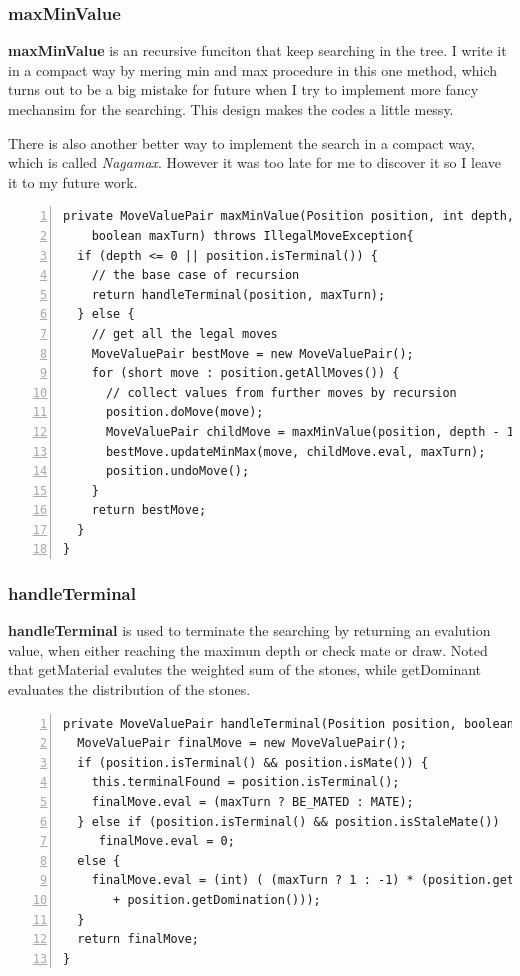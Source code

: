 \documentclass{article}
\begin{document}
\subsubsection{maxMinValue}

\textbf{maxMinValue} is an recursive funciton that keep searching in the tree. I write it in a compact way by mering min and max procedure in this one method, which turns out to be a big mistake for future when I try to implement more fancy mechansim for the searching. This design makes the codes a little messy.

There is also another better way to implement the search in a compact way, which is called \emph{Nagamax}. However it was too late for me to discover it so I leave it to my future work.

\begin{lstlisting}[numbers=left]
private MoveValuePair maxMinValue(Position position, int depth, 
    boolean maxTurn) throws IllegalMoveException{
  if (depth <= 0 || position.isTerminal()) {
    // the base case of recursion
    return handleTerminal(position, maxTurn);
  } else {
    // get all the legal moves
    MoveValuePair bestMove = new MoveValuePair();
    for (short move : position.getAllMoves()) {
      // collect values from further moves by recursion
      position.doMove(move);
      MoveValuePair childMove = maxMinValue(position, depth - 1, !maxTurn);
      bestMove.updateMinMax(move, childMove.eval, maxTurn);
      position.undoMove();
    }
    return bestMove;
  }
}
\end{lstlisting}

\subsubsection{handleTerminal}

\textbf{handleTerminal} is used to terminate the searching by returning an evalution value, when either reaching the maximun depth or check mate or draw. Noted that getMaterial evalutes the weighted sum of the stones, while getDominant evaluates the distribution of the stones.

\begin{lstlisting}[numbers=left]
private MoveValuePair handleTerminal(Position position, boolean maxTurn) {
  MoveValuePair finalMove = new MoveValuePair();
  if (position.isTerminal() && position.isMate()) {
    this.terminalFound = position.isTerminal();
    finalMove.eval = (maxTurn ? BE_MATED : MATE);
  } else if (position.isTerminal() && position.isStaleMate())
     finalMove.eval = 0;
  else {
    finalMove.eval = (int) ( (maxTurn ? 1 : -1) * (position.getMaterial() 
       + position.getDomination()));
  }
  return finalMove;
}
\end{lstlisting}
\end{document}
